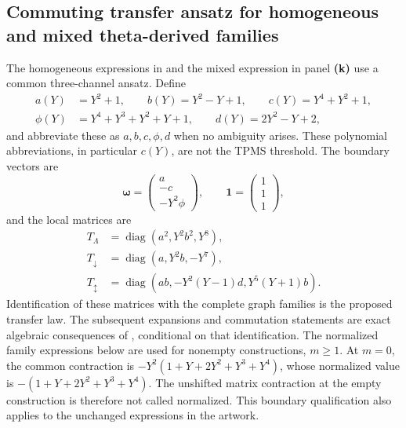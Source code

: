 \subsection{Commuting transfer ansatz for homogeneous and mixed theta-derived families}
\label{supp:transfer_commuting}
\label{supp:transfer_common_notation}
The homogeneous expressions in  and the mixed expression in panel \textbf{(k)} use a common three-channel ansatz. Define
\begin{equation}
\begin{aligned}
a(Y)&=Y^2+1,\qquad b(Y)=Y^2-Y+1,\qquad c(Y)=Y^4+Y^2+1,\\
\phi(Y)&=Y^4+Y^3+Y^2+Y+1,\qquad d(Y)=2Y^2-Y+2,
\end{aligned}
\label{supp:deriv:eq:factors}
\end{equation}
and abbreviate these as $a,b,c,\phi,d$ when no ambiguity arises. These polynomial abbreviations, in particular $c(Y)$, are not the TPMS threshold. The boundary vectors are
\begin{equation}
\bm\omega=\begin{pmatrix}a\\-c\\-Y^2\phi\end{pmatrix},\qquad
\bm 1=\begin{pmatrix}1\\1\\1\end{pmatrix},
\label{supp:deriv:eq:omega}
\end{equation}
and the local matrices are
\begin{equation}
\begin{aligned}
T_\Lambda&=\operatorname{diag}(a^2,Y^2b^2,Y^8),\\
T_\downarrow&=\operatorname{diag}(a,Y^2b,-Y^7),\\
T_\updownarrow&=\operatorname{diag}(ab,-Y^2(Y-1)d,Y^5(Y+1)b).
\end{aligned}
\label{supp:deriv:eq:transfers}
\end{equation}
Identification of these matrices with the complete graph families is the proposed transfer law. The subsequent expansions and commutation statements are exact algebraic consequences of , conditional on that identification. The normalized family expressions below are used for nonempty constructions, $m\geq1$. At $m=0$, the common contraction is $-Y^2(1+Y+2Y^2+Y^3+Y^4)$, whose normalized value is $-(1+Y+2Y^2+Y^3+Y^4)$. The unshifted matrix contraction at the empty construction is therefore not called normalized. This boundary qualification also applies to the unchanged expressions in the artwork.

